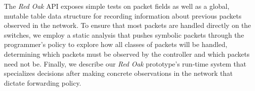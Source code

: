 \documentclass[preprint]{sigplanconf}
\begin{document}
The \textit{Red Oak} API exposes simple tests on packet fields as well as a global, mutable table data
structure for recording information about previous packets observed in the network.
To ensure that most packets are handled directly on the switches, we employ a static analysis
that pushes symbolic packets through the programmer's policy to explore how all classes of 
packets will be handled, determining which packets must be observed by the controller and which 
packets need not be. Finally, we describe our \textit{Red Oak} prototype's run-time system that 
specializes decisions after making concrete observations in the network that dictate forwarding policy.




\end{document}
